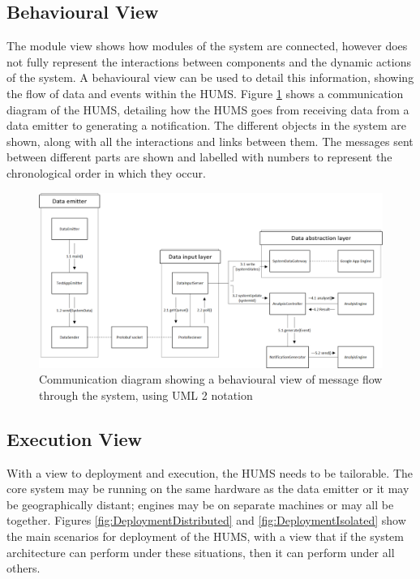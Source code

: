 \documentclass[10pt,a4paper]{article}
\begin{document}
\subsection{Behavioural View}

The module view shows how modules of the system are connected, however 
does not fully represent the interactions between components and the dynamic actions of the system. A behavioural view can be used to detail this information, showing the flow of data and events within the HUMS. Figure \ref{fig:CommunicationDiagram} shows a communication diagram of the 
HUMS, detailing how the HUMS goes from receiving data from a data emitter to generating a notification. The different objects in the system are shown, along with all the interactions and links between them. The messages sent between different parts are shown and labelled with numbers to represent the chronological order in which they occur.

\begin{figure}[!ht]
  \centering
  \includegraphics[width=14cm]{images/CommunicationDiagram.png}
  \caption{Communication diagram showing a behavioural view of message 
flow
through the system, using UML 2 notation}
  \label{fig:CommunicationDiagram}
\end{figure}


\subsection{Execution View}
With a view to deployment and execution, the HUMS needs to be tailorable. The core system may be running on the same hardware as the data emitter or it may be geographically distant; engines may be on separate machines or may all be together. Figures \ref{fig:DeploymentDistributed} and \ref{fig:DeploymentIsolated} show the main scenarios for deployment of the HUMS, with a view that if the system architecture can perform under these situations, then it can perform under all others.
\end{document}
